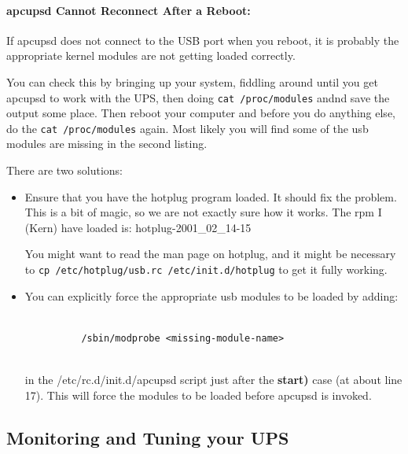 {{{{\label{apcupsd-Cannot-Reconnect-After-a-Reboot}

\paragraph*{apcupsd Cannot Reconnect After a Reboot:}

\label{index-Problems_002c-reconnect-108}
If apcupsd does not connect to the USB port when you reboot, it is probably
the appropriate kernel modules are not getting loaded correctly.  

You can check this by bringing up your system, fiddling around until you get
apcupsd to work with the UPS, then doing {\tt cat /proc/modules} andnd save
the output some place. Then reboot your computer and before you do anything
else, do the {\tt cat /proc/modules} again. Most likely you will find some of
the usb modules are missing in the second listing.  

There are two solutions:  

\begin{itemize}
\item Ensure that you have the hotplug program loaded. It should fix the
problem. This is a bit of magic, so we are not exactly sure how it works. The
rpm I (Kern) have loaded is: hotplug-2001\_02\_14-15  

You might want to read the man page on hotplug, and it might be necessary to
{\tt cp /etc/hotplug/usb.rc /etc/init.d/hotplug} to get it fully working.  
\item You can explicitly force the appropriate usb modules to be loaded by
adding:  

\footnotesize
\begin{verbatim}
          
          /sbin/modprobe <missing-module-name>
     
\end{verbatim}
\normalsize

in the /etc/rc.d/init.d/apcupsd script just after the {\bf start)} case (at
about line 17). This will force the modules to be loaded before apcupsd is
invoked. 
\end{itemize}

\label{Monitoring-and-Tuning-your-UPS}

\subsection*{Monitoring and Tuning your UPS}

}}}}
